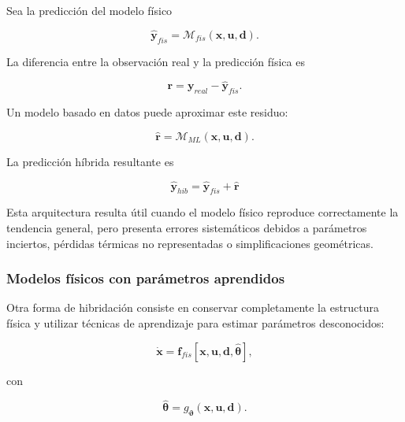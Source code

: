 Sea la predicción del modelo físico

\begin{equation}
\hat{\mathbf{y}}_{fis}
=
\mathcal{M}_{fis}
\left(
\mathbf{x},
\mathbf{u},
\mathbf{d}
\right).
\end{equation}

La diferencia entre la observación real y la predicción física es

\begin{equation}
\mathbf{r}
=
\mathbf{y}_{real}
-
\hat{\mathbf{y}}_{fis}.
\label{eq:residuo_modelo_fisico}
\end{equation}

Un modelo basado en datos puede aproximar este residuo:

\begin{equation}
\hat{\mathbf{r}}
=
\mathcal{M}_{ML}
\left(
\mathbf{x},
\mathbf{u},
\mathbf{d}
\right).
\end{equation}

La predicción híbrida resultante es

\begin{equation}
\boxed{
\hat{\mathbf{y}}_{hib}
=
\hat{\mathbf{y}}_{fis}
+
\hat{\mathbf{r}}
}
\label{eq:prediccion_hibrida}
\end{equation}

Esta arquitectura resulta útil cuando el modelo físico reproduce correctamente la tendencia general, pero presenta errores sistemáticos debidos a parámetros inciertos, pérdidas térmicas no representadas o simplificaciones geométricas.

\subsubsection{Modelos físicos con parámetros aprendidos}

Otra forma de hibridación consiste en conservar completamente la estructura física y utilizar técnicas de aprendizaje para estimar parámetros desconocidos:

\begin{equation}
\dot{\mathbf{x}}
=
\mathbf{f}_{fis}
\left[
\mathbf{x},
\mathbf{u},
\mathbf{d},
\hat{\boldsymbol{\theta}}
\right],
\end{equation}

con

\begin{equation}
\hat{\boldsymbol{\theta}}
=
g_{\boldsymbol{\vartheta}}
\left(
\mathbf{x},
\mathbf{u},
\mathbf{d}
\right).
\end{equation}

